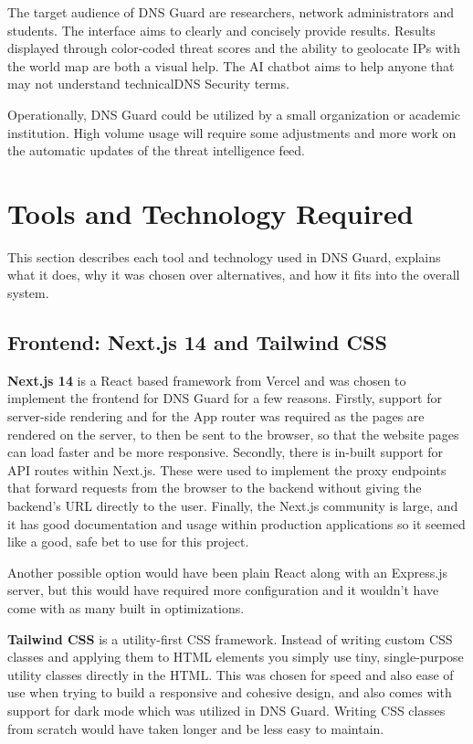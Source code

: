 \documentclass[12pt, a4paper, oneside]{report}
\begin{document}
The target audience of DNS Guard are researchers, network administrators and students. The interface aims to clearly and concisely provide results. Results displayed through color-coded threat scores and the ability to geolocate IPs with the world map are both a visual help. The AI chatbot aims to help anyone that may not understand technicalDNS Security terms.

Operationally, DNS Guard could be utilized by a small organization or academic institution. High volume usage will require some adjustments and more work on the automatic updates of the threat intelligence feed.

\section{Tools and Technology Required}

This section describes each tool and technology used in DNS Guard, explains what it does, why it was chosen over alternatives, and how it fits into the overall system.

\subsection{Frontend: Next.js 14 and Tailwind CSS}

\textbf{Next.js 14} \cite{nextjs2024} is a React based framework from Vercel and was chosen to implement the frontend for DNS Guard for a few reasons. Firstly, support for server-side rendering and for the App router was required as the pages are rendered on the server, to then be sent to the browser, so that the website pages can load faster and be more responsive. Secondly, there is in-built support for API routes within Next.js. These were used to implement the proxy endpoints that forward requests from the browser to the backend without giving the backend's URL directly to the user. Finally, the Next.js community is large, and it has good documentation and usage within production applications so it seemed like a good, safe bet to use for this project.

Another possible option would have been plain React along with an Express.js server, but this would have required more configuration and it wouldn't have come with as many built in optimizations.

\textbf{Tailwind CSS} \cite{tailwindcss2024} is a utility-first CSS framework. Instead of writing custom CSS classes and applying them to HTML elements you simply use tiny, single-purpose utility classes directly in the HTML. This was chosen for speed and also ease of use when trying to build a responsive and cohesive design, and also comes with support for dark mode which was utilized in DNS Guard. Writing CSS classes from scratch would have taken longer and be less easy to maintain.
\end{document}
